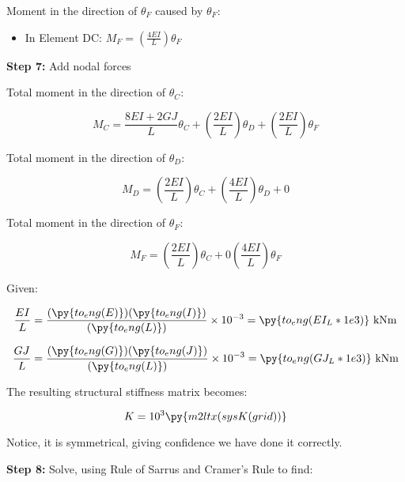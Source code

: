\documentclass[a4paper,11pt]{article}
\begin{document}
\begin{hidden}
Moment in the direction of $\theta_F$ caused by $\theta_F$: 

\begin{itemize}
	\item In Element DC: $M_F = \left(\frac{4EI}{L}\right)\theta_F$
\end{itemize}			
		
\textbf{Step 7:} Add nodal forces

Total moment in the direction of $\theta_C$: 

\begin{equation}
	M_C = \frac{8EI+2GJ}{L}\theta_C +  \left(\frac{2EI}{L}\right)\theta_D + \left(\frac{2EI}{L}\right)\theta_F  
\end{equation}

Total moment in the direction of $\theta_D$: 

\begin{equation}
	M_D = \left(\frac{2EI}{L}\right)\theta_C + \left(\frac{4EI}{L}\right)\theta_D + 0  
\end{equation}

Total moment in the direction of $\theta_F$:

\begin{equation}
	M_F = \left(\frac{2EI}{L}\right)\theta_C + 0 \left(\frac{4EI}{L}\right)\theta_F  
\end{equation}

Given: 

\begin{equation}
\frac{EI}{L} = \frac{ \left( \py{to_eng(E)} \right)\left(\py{to_eng(I)}\right) }
					{ \left(\py{to_eng(L)}\right) } \times 10^{-3}
				=\py{to_eng(EI_L*1e3)}~\mathrm{kNm}
\end{equation}


\begin{equation}
\frac{GJ}{L} = \frac{ \left( \py{to_eng(G)} \right)\left(\py{to_eng(J)}\right) }
					{ \left(\py{to_eng(L)}\right) } \times 10^{-3}
				=\py{to_eng(GJ_L*1e3)}~\mathrm{kNm}
\end{equation}

The resulting structural stiffness matrix becomes: 

\begin{equation}
	K = 10^3 \py{m2ltx(sysK(grid))}
\end{equation}

Notice, it is symmetrical, giving confidence we have done it correctly.  

\textbf{Step 8:} Solve, using Rule of Sarrus and Cramer's Rule to find:
	

\end{hidden}
\end{document}

